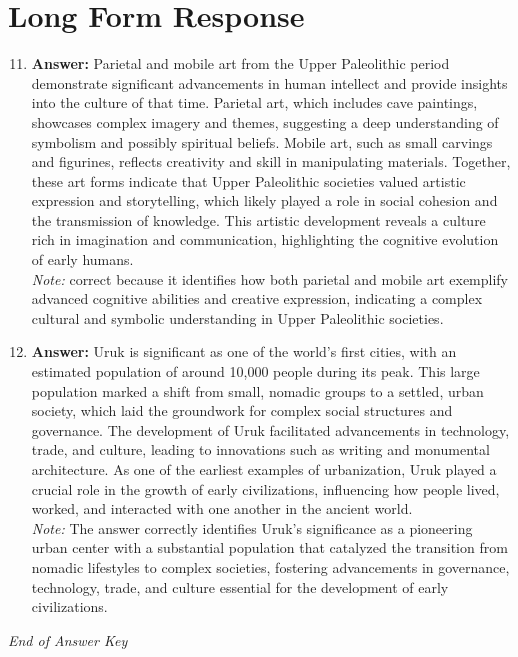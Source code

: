 \documentclass[12pt]{article}
\begin{document}
\section*{Long Form Response}
\begin{enumerate}[label=\arabic*.]
\setcounter{enumi}{10}
\item \textbf{Answer:} Parietal and mobile art from the Upper Paleolithic period demonstrate significant advancements in human intellect and provide insights into the culture of that time. Parietal art, which includes cave paintings, showcases complex imagery and themes, suggesting a deep understanding of symbolism and possibly spiritual beliefs. Mobile art, such as small carvings and figurines, reflects creativity and skill in manipulating materials. Together, these art forms indicate that Upper Paleolithic societies valued artistic expression and storytelling, which likely played a role in social cohesion and the transmission of knowledge. This artistic development reveals a culture rich in imagination and communication, highlighting the cognitive evolution of early humans.
\\ \textit{Note:} correct because it identifies how both parietal and mobile art exemplify advanced cognitive abilities and creative expression, indicating a complex cultural and symbolic understanding in Upper Paleolithic societies.
\item \textbf{Answer:} Uruk is significant as one of the world's first cities, with an estimated population of around 10,000 people during its peak. This large population marked a shift from small, nomadic groups to a settled, urban society, which laid the groundwork for complex social structures and governance. The development of Uruk facilitated advancements in technology, trade, and culture, leading to innovations such as writing and monumental architecture. As one of the earliest examples of urbanization, Uruk played a crucial role in the growth of early civilizations, influencing how people lived, worked, and interacted with one another in the ancient world.
\\ \textit{Note:} The answer correctly identifies Uruk's significance as a pioneering urban center with a substantial population that catalyzed the transition from nomadic lifestyles to complex societies, fostering advancements in governance, technology, trade, and culture essential for the development of early civilizations.
\end{enumerate}

\vfill
\noindent\textit{End of Answer Key}
\end{document}
